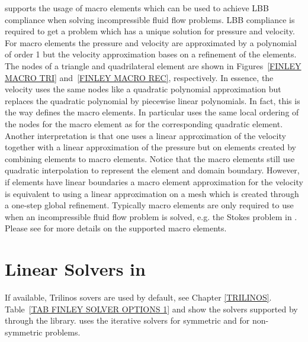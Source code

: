 \finley supports the usage of macro elements which can be
used to achieve LBB compliance when solving incompressible fluid flow problems.
LBB compliance is required to get a problem which has a unique solution for
pressure and velocity. For macro elements the pressure and velocity are
approximated by a polynomial of order 1 but the velocity approximation bases on
a refinement of the elements. The nodes of a triangle and quadrilateral element
are shown in Figures~\ref{FINLEY MACRO TRI} and~\ref{FINLEY MACRO REC},
respectively. In essence, the velocity uses the same nodes like a quadratic
polynomial approximation but replaces the quadratic polynomial by piecewise
linear polynomials. In fact, this is the way \finley defines the macro elements.
In particular \finley uses the same local ordering of the nodes for the macro
element as for the corresponding quadratic element. Another interpretation is
that one uses a linear approximation of the velocity together with a linear
approximation of the pressure but on elements created by combining elements to
macro elements. Notice that the macro elements still use quadratic
interpolation to represent the element and domain boundary.
However, if elements have linear boundaries a macro element approximation for
the velocity is equivalent to using a linear approximation on a mesh which is
created through a one-step global refinement.
Typically macro elements are only required to use when an incompressible fluid
flow problem is solved, e.g. the Stokes problem in .
Please see  for more details on the supported macro elements.

\section{Linear Solvers in \SolverOptions}
If available, Trilinos sovers are used by default, see Chapter \ref{TRILINOS}.
Table~\ref{TAB FINLEY SOLVER OPTIONS 1} and
show the solvers %
supported by \finley through the \PASO library.
\finley uses the iterative solvers \PCG for symmetric and \BiCGStab
for non-symmetric problems.

